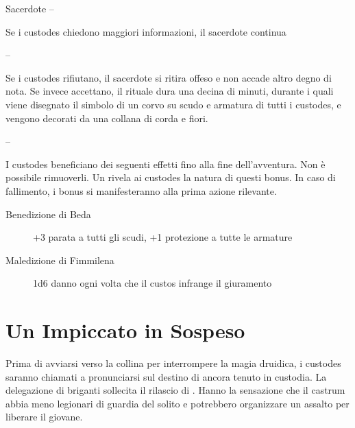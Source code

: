 \documentclass[11.5pt,twocolumn]{article}
\newcommand\geordie{Georgius Mar Mathan}
\begin{document}
Sacerdote --

Se i custodes chiedono maggiori informazioni, il sacerdote continua

-- 

Se i custodes rifiutano, il sacerdote si ritira offeso e non accade altro degno di nota.
Se invece accettano, il rituale dura una decina di minuti, durante i quali viene disegnato il simbolo di un corvo su scudo e armatura di tutti i custodes, e vengono decorati da una collana di corda e fiori.

-- 

I custodes beneficiano dei seguenti effetti fino alla fine dell'avventura. Non \`{e} possibile rimuoverli.
Un  rivela ai custodes la natura di questi bonus.
In caso di fallimento, i bonus si manifesteranno alla prima azione rilevante.
\begin{description}
\item[Benedizione di Beda] +3 parata a tutti gli scudi, +1 protezione a tutte le armature
\item[Maledizione di Fimmilena] 1d6 danno ogni volta che il custos infrange il giuramento
\end{description}


\section{Un Impiccato in Sospeso}
%

Prima di avviarsi verso la collina per interrompere la magia druidica, i custodes saranno chiamati a pronunciarsi sul destino di \npcref{\geordie} ancora tenuto in custodia.
La delegazione di briganti sollecita il rilascio di \npcref{\geordie}.
Hanno la sensazione che il castrum abbia meno legionari di guardia del solito e potrebbero organizzare un assalto per liberare il giovane.
\end{document}
